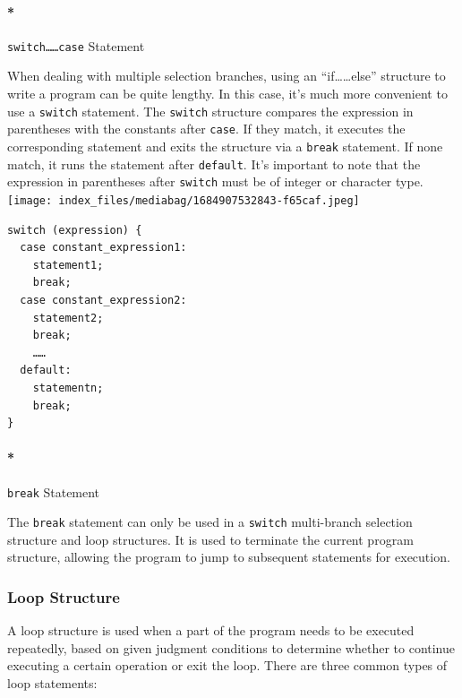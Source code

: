 \documentclass[
  letterpaper,
  DIV=11,
  numbers=noendperiod]{scrreprt}
\let\oldparagraph\paragraph
\renewcommand{\paragraph}[1]{\oldparagraph{#1}\mbox{}}
\begin{document}
\hypertarget{switchcase-statement}{%
\paragraph*{\texorpdfstring{\texttt{switch……case}
Statement}{switch\ldots\ldots case Statement}}\label{switchcase-statement}}

When dealing with multiple selection branches, using an
``if\ldots\ldots else'' structure to write a program can be quite
lengthy. In this case, it's much more convenient to use a
\texttt{switch} statement. The \texttt{switch} structure compares the
expression in parentheses with the constants after \texttt{case}. If
they match, it executes the corresponding statement and exits the
structure via a \texttt{break} statement. If none match, it runs the
statement after \texttt{default}. It's important to note that the
expression in parentheses after \texttt{switch} must be of integer or
character type.
\texttt{[image: index\_files/mediabag/1684907532843-f65caf.jpeg]}

\begin{verbatim}
switch (expression) {
  case constant_expression1:
    statement1;
    break;
  case constant_expression2:
    statement2;
    break;
    ……
  default:
    statementn;
    break;
}
\end{verbatim}

\hypertarget{break-statement}{%
\paragraph*{\texorpdfstring{\texttt{break}
Statement}{break Statement}}\label{break-statement}}

The \texttt{break} statement can only be used in a \texttt{switch}
multi-branch selection structure and loop structures. It is used to
terminate the current program structure, allowing the program to jump to
subsequent statements for execution.

\hypertarget{loop-structure}{%
\subsubsection*{Loop Structure}\label{loop-structure}}

A loop structure is used when a part of the program needs to be executed
repeatedly, based on given judgment conditions to determine whether to
continue executing a certain operation or exit the loop. There are three
common types of loop statements:
\end{document}
